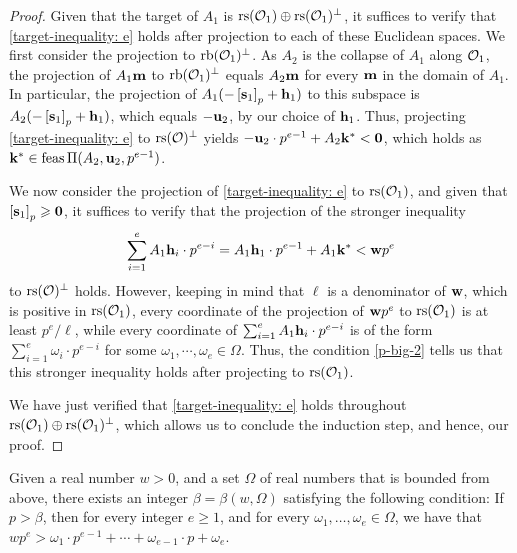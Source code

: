 \documentclass[11pt]{amsart}
\begin{document}
\begin{proof}
Given that the target of $A_1$ is $\operatorname{rs}(\mathcal{O}_1) \oplus \operatorname{rs}(\mathcal{O}_1)^{\perp}$, it suffices to verify that \eqref{target-inequality: e} holds after projection to each of these Euclidean spaces.  We first consider the projection to $\operatorname{rb}(\mathcal{O}_1)^{\perp}$.  As $A_2$ is the collapse of $A_1$ along $\mathcal{O}_1$, the projection of $A_1 \mathbf{m}$ to $\operatorname{rb}(\mathcal{O}_1)^{\perp}$ equals $A_2 \mathbf{m}$ for every $\mathbf{m}$ in the domain of $A_1$.  In particular, the projection of $A_1( - \left[ \mathbf{s}_1 \right]_p + \mathbf{h}_1 )$ to this subspace is $A_2 ( - \left[ \mathbf{s}_1 \right]_p + \mathbf{h}_1 )$, which equals $-\mathbf{u}_2$, by our choice of $\mathbf{h}_1$.  Thus, projecting \eqref{target-inequality: e} to $\operatorname{rs}(\mathcal{O})^{\perp}$ yields $-\mathbf{u}_2 \cdot p^{e-1} + A_2 \mathbf{k}^{\ast} < \mathbf{0}$, which holds as $\mathbf{k}^{\ast} \in \operatorname{feas} \Pi(A_2, \mathbf{u}_2, p^{e-1})$.

We now consider the projection of \eqref{target-inequality: e} to $\operatorname{rs}(\mathcal{O}_1)$, and given that $\left[ \mathbf{s}_1 \right]_p \geqslant \mathbf{0}$, it suffices to verify that the projection of the stronger inequality \[ \sum_{i=1}^{e} A_1 \mathbf{h}_i \cdot p^{e-i} = A_1 \mathbf{h}_1 \cdot p^{e-1} + A_1 \mathbf{k}^{\ast} < \mathbf{w}p^e \] to $\operatorname{rs}(\mathcal{O})^{\perp}$ holds.  However, keeping in mind that $\ell$ is a denominator of $\mathbf{w}$, which is positive in $\operatorname{rs}(\mathcal{O}_1)$, every coordinate of the projection of $\mathbf{w} p^e$ to $\operatorname{rs}(\mathcal{O}_1)$ is at least $p^e / \ell$, while every coordinate of $\sum_{i=1}^{e} A_1 \mathbf{h}_i \cdot p^{e-i}$ is of the form $\sum_{i=1}^{e} \omega_i \cdot p^{e-i}$ for some $\omega_1, \cdots, \omega_e \in \Omega$.  Thus, the condition \eqref{p-big-2} tells us that this stronger inequality holds after projecting to $\operatorname{rs}(\mathcal{O}_1)$.

We have just verified that \eqref{target-inequality: e} holds throughout $\operatorname{rs}(\mathcal{O}_1) \oplus \operatorname{rs}(\mathcal{O}_1)^{\perp}$, which allows us to conclude the induction step, and hence, our proof.
\end{proof}

\begin{lemma}
   \label{positive-polynomial: L}
   Given a real number $w > 0$, and a set $\Omega$ of real numbers that is bounded from above, there exists an integer $\beta = \beta(w, \Omega)$ satisfying the following condition\textup:
   If $p > \beta$, then for every integer $e \geq 1$, and for every $\omega_1, \ldots, \omega_e \in \Omega$, we have that $wp^{e} >  \omega_1 \cdot p^{e-1} + \cdots + \omega_{e-1} \cdot p + \omega_e$.
\end{lemma}
\end{document}

